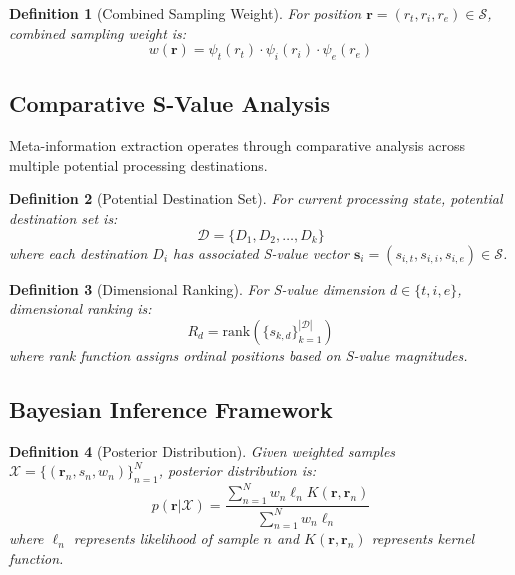 \documentclass[12pt,a4paper]{article}
\newtheorem{definition}{Definition}
\begin{document}
\begin{definition}[Combined Sampling Weight]
For position $\mathbf{r} = (r_t, r_i, r_e) \in \mathcal{S}$, combined sampling weight is:
\begin{equation}
w(\mathbf{r}) = \psi_t(r_t) \cdot \psi_i(r_i) \cdot \psi_e(r_e)
\end{equation}
\end{definition}

\subsection{Comparative S-Value Analysis}

Meta-information extraction operates through comparative analysis across multiple potential processing destinations.

\begin{definition}[Potential Destination Set]
For current processing state, potential destination set is:
\begin{equation}
\mathcal{D} = \{D_1, D_2, \ldots, D_k\}
\end{equation}
where each destination $D_i$ has associated S-value vector $\mathbf{s}_i = (s_{i,t}, s_{i,i}, s_{i,e}) \in \mathcal{S}$.
\end{definition}

\begin{definition}[Dimensional Ranking]
For S-value dimension $d \in \{t, i, e\}$, dimensional ranking is:
\begin{equation}
R_d = \text{rank}(\{s_{k,d}\}_{k=1}^{|\mathcal{D}|})
\end{equation}
where rank function assigns ordinal positions based on S-value magnitudes.
\end{definition}

\subsection{Bayesian Inference Framework}

\begin{definition}[Posterior Distribution]
Given weighted samples $\mathcal{X} = \{(\mathbf{r}_n, s_n, w_n)\}_{n=1}^N$, posterior distribution is:
\begin{equation}
p(\mathbf{r} | \mathcal{X}) = \frac{\sum_{n=1}^N w_n \ell_n K(\mathbf{r}, \mathbf{r}_n)}{\sum_{n=1}^N w_n \ell_n}
\end{equation}
where $\ell_n$ represents likelihood of sample $n$ and $K(\mathbf{r}, \mathbf{r}_n)$ represents kernel function.
\end{definition}
\end{document}
